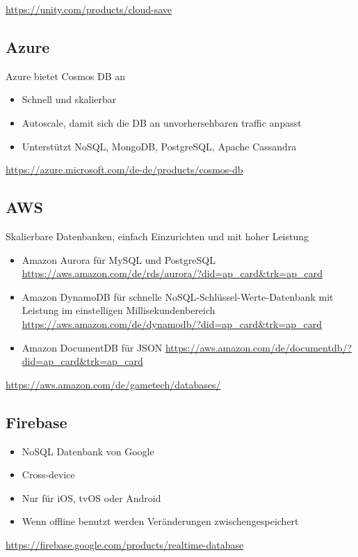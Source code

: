 \url{https://unity.com/products/cloud-save}

\subsection{Azure}
Azure bietet Cosmos DB an \\
\begin{itemize}
    \item Schnell und skalierbar
    \item Autoscale, damit sich die DB an unvorhersehbaren traffic anpasst
    \item Unterstützt NoSQL, MongoDB, PostgreSQL, Apache Cassandra
\end{itemize}
\url{https://azure.microsoft.com/de-de/products/cosmos-db}

\subsection{AWS}
Skalierbare Datenbanken, einfach Einzurichten und mit hoher Leistung
\begin{itemize}
    \item Amazon Aurora für MySQL und PostgreSQL \url{https://aws.amazon.com/de/rds/aurora/?did=ap_card&trk=ap_card}
    \item Amazon DynamoDB für schnelle NoSQL-Schlüssel-Werte-Datenbank mit Leistung im einstelligen Millisekundenbereich \url{https://aws.amazon.com/de/dynamodb/?did=ap_card&trk=ap_card}
    \item Amazon DocumentDB für JSON \url{https://aws.amazon.com/de/documentdb/?did=ap_card&trk=ap_card}
\end{itemize}

\url{https://aws.amazon.com/de/gametech/databases/}

\subsection{Firebase}

\begin{itemize}
    \item NoSQL Datenbank von Google
    \item Cross-device
    \item Nur für iOS, tvOS oder Android
    \item Wenn offline benutzt werden Veränderungen zwischengespeichert
\end{itemize}

\url{https://firebase.google.com/products/realtime-database}

